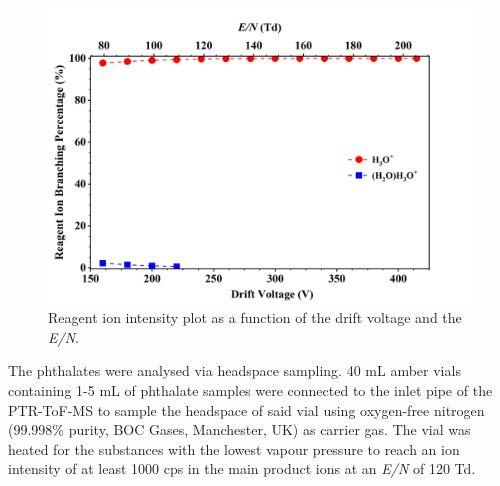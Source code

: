         \begin{figure}[htb]%
        \centering
        \includegraphics[height=0.4\textheight]{pics/PH/RI-BR.png}
        \caption{Reagent ion intensity plot as a function of the drift voltage and the \textit{E/N}.}
        \label{fig:PH_RI}
        \end{figure}




The phthalates were analysed via headspace sampling. 
%
40 mL amber vials containing 1-5 mL of  phthalate samples were connected to the inlet pipe of the PTR-ToF-MS to sample the headspace of said vial using oxygen-free nitrogen (99.998\% purity, BOC Gases, Manchester, UK) as carrier gas.
%
The vial was heated for the substances with the lowest vapour pressure  %
to reach an ion intensity of at least 1000%
 cps in the main product ions  at an \textit{E/N} of 120 Td.
%



